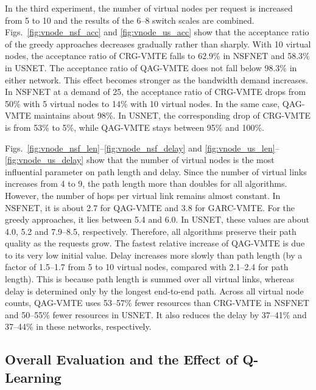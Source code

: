 In the third experiment, the number of virtual nodes per request is increased from 5 to 10 and the results of the 6--8 switch scales are combined. Figs.~\ref{fig:vnode_nsf_acc} and \ref{fig:vnode_us_acc} show that the acceptance ratio of the greedy approaches decreases gradually rather than sharply. With 10 virtual nodes, the acceptance ratio of CRG-VMTE falls to 62.9\% in NSFNET and 58.3\% in USNET. The acceptance ratio of QAG-VMTE does not fall below 98.3\% in either network. This effect becomes stronger as the bandwidth demand increases. In NSFNET at a demand of 25, the acceptance ratio of CRG-VMTE drops from 50\% with 5 virtual nodes to 14\% with 10 virtual nodes. In the same case, QAG-VMTE maintains about 98\%. In USNET, the corresponding drop of CRG-VMTE is from 53\% to 5\%, while QAG-VMTE stays between 95\% and 100\%.

Figs.~\ref{fig:vnode_nsf_len}--\ref{fig:vnode_nsf_delay} and \ref{fig:vnode_us_len}--\ref{fig:vnode_us_delay} show that the number of virtual nodes is the most influential parameter on path length and delay. Since the number of virtual links increases from 4 to 9, the path length more than doubles for all algorithms. However, the number of hops per virtual link remains almost constant. In NSFNET, it is about 2.7 for QAG-VMTE and 3.8 for GARC-VMTE. For the greedy approaches, it lies between 5.4 and 6.0. In USNET, these values are about 4.0, 5.2 and 7.9--8.5, respectively. Therefore, all algorithms preserve their path quality as the requests grow. The fastest relative increase of QAG-VMTE is due to its very low initial value. Delay increases more slowly than path length (by a factor of 1.5--1.7 from 5 to 10 virtual nodes, compared with 2.1--2.4 for path length). This is because path length is summed over all virtual links, whereas delay is determined only by the longest end-to-end path. Across all virtual node counts, QAG-VMTE uses 53--57\% fewer resources than CRG-VMTE in NSFNET and 50--55\% fewer resources in USNET. It also reduces the delay by 37--41\% and 37--44\% in these networks, respectively.

\subsection{Overall Evaluation and the Effect of Q-Learning}
\label{subsec:overall}

